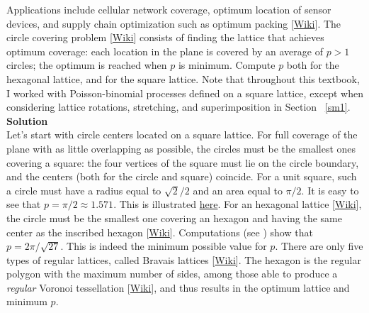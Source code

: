 \documentclass[10pt]{article}
\begin{document}
\begin{Exercise}
Applications include cellular network coverage, optimum location of sensor devices, and supply chain optimization such as optimum packing [\href{https://en.wikipedia.org/wiki/Circle_packing}{Wiki}]. The \textcolor{index}{circle covering problem} 
[\href{https://en.wikipedia.org/wiki/Overlapping_circles_grid}{Wiki}] consists of finding the lattice that achieves optimum coverage: each location
in the plane is covered by an average of $p>1$ circles; the optimum is reached when $p$ is minimum.  Compute $p$ both for the hexagonal lattice, and for the square lattice. Note that throughout this textbook, I worked with Poisson-binomial processes defined on a square lattice, except when considering lattice rotations, stretching, and superimposition in Section ~\ref{sm1}. \vspace{1ex} \\
{\bf Solution}  \vspace{1ex} \\
Let's start with circle centers located on a square lattice. For full coverage of the plane with as little overlapping as possible, the circles must be the smallest ones covering a square: the four vertices of the square must lie on the circle boundary, and the centers (both for the circle and square) coincide. For a unit square, such a circle must have a radius equal to $\sqrt{2}/2$ and an area equal to  $\pi/2$. 
It is easy to see that $p=\pi/2\approx 1.571$. 
This is illustrated  \href{https://en.wikipedia.org/wiki/Overlapping_circles_grid}{here}. For an 
\textcolor{index}{hexagonal lattice} [\href{https://en.wikipedia.org/wiki/Hexagonal}{Wiki}], the circle must be the smallest one covering an hexagon and having the same center as the inscribed hexagon [\href{https://en.wikipedia.org/wiki/Hexagon}{Wiki}]. Computations (see \cite{circle34}) show that $p= 2\pi/\sqrt{27}$. This is indeed the minimum possible value for $p$. There are only five types of regular lattices, called \textcolor{index}{Bravais lattices} [\href{https://en.wikipedia.org/wiki/Bravais_lattice}{Wiki}]. 
The hexagon is the regular polygon with the maximum number of sides, among those able to produce a {\em regular} \textcolor{index}{Voronoi tessellation}
 [\href{https://en.wikipedia.org/wiki/Voronoi_diagram}{Wiki}], and thus results in the optimum lattice and minimum $p$.
\end{Exercise}
\end{document}
